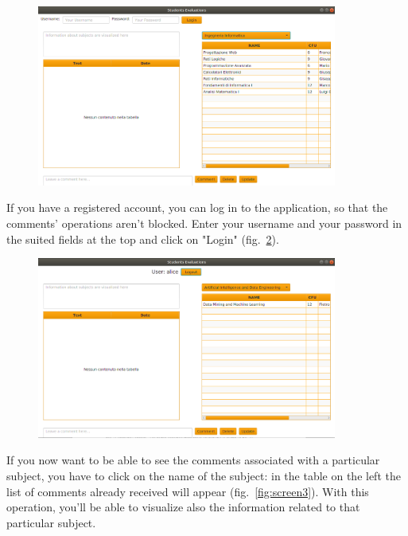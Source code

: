\documentclass[a4paper]{article}
\begin{document}
\begin{figure}[h]
\centering
\includegraphics[width=0.88\textwidth]{images/screens/screen1}
\label{fig:screen1}
\end{figure}
\clearpage

If you have a registered account, you can log in to the application, so that the comments' operations aren't blocked. Enter your username and your password in the suited fields at the top and click on "Login" (fig.~\ref{fig:screenLogin}).
\begin{figure}[h]
\centering
\includegraphics[width=0.88\textwidth]{images/screens/screenLogin}
\label{fig:screenLogin}
\end{figure}

If you now want to be able to see the comments associated with a particular subject, you have to click on the name of the subject: in the table on the left the list of comments already received will appear (fig.~\ref{fig:screen3}). With this operation, you'll be able to visualize also the information related to that particular subject.
\end{document}

